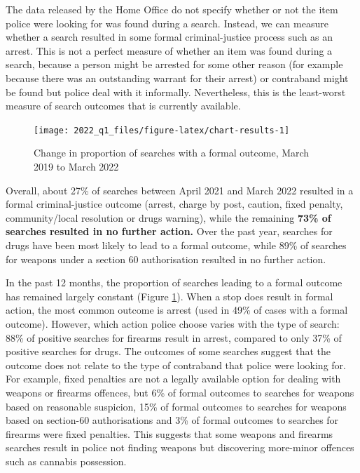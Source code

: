 \documentclass[
  a4paper,
  twoside, 11pt]{article}
\begin{document}
The data released by the Home Office do not specify whether or not the item police were looking for was found during a search. Instead, we can measure whether a search resulted in some formal criminal-justice process such as an arrest. This is not a perfect measure of whether an item was found during a search, because a person might be arrested for some other reason (for example because there was an outstanding warrant for their arrest) or contraband might be found but police deal with it informally. Nevertheless, this is the least-worst measure of search outcomes that is currently available.



\begin{figure}[tb]

{\centering \texttt{[image: 2022\_q1\_files/figure-latex/chart-results-1]} 

}

\caption{Change in proportion of searches with a formal outcome, March 2019 to March 2022}\label{fig:chart-results}
\end{figure}

Overall, about 27\% of searches between April 2021 and March 2022 resulted in a formal criminal-justice outcome (arrest, charge by post, caution, fixed penalty, community/local resolution or drugs warning), while the remaining \textbf{73\% of searches resulted in no further action.} Over the past year, searches for drugs have been most likely to lead to a formal outcome, while 89\% of searches for weapons under a section 60 authorisation resulted in no further action.

In the past 12 months, the proportion of searches leading to a formal outcome has remained largely constant (Figure \ref{fig:chart-results}). When a stop does result in formal action, the most common outcome is arrest (used in 49\% of cases with a formal outcome). However, which action police choose varies with the type of search: 88\% of positive searches for firearms result in arrest, compared to only 37\% of positive searches for drugs. The outcomes of some searches suggest that the outcome does not relate to the type of contraband that police were looking for. For example, fixed penalties are not a legally available option for dealing with weapons or firearms offences, but 6\% of formal outcomes to searches for weapons based on reasonable suspicion, 15\% of formal outcomes to searches for weapons based on section-60 authorisations and 3\% of formal outcomes to searches for firearms were fixed penalties. This suggests that some weapons and firearms searches result in police not finding weapons but discovering more-minor offences such as cannabis possession.
\end{document}
